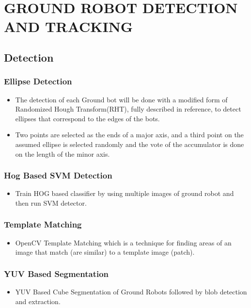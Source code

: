 \documentclass[12pt]{article}
\begin{document}
\section{GROUND ROBOT DETECTION AND TRACKING}
    \subsection{Detection}
        \subsubsection{Ellipse Detection}
            \begin{itemize}
                \item The detection of each Ground bot will be done with a modified form of Randomized Hough Transform(RHT), fully described in reference, to detect ellipses that correspond to the edges of the bots. 
                \item Two points are selected as the ends of a major axis, and a third point on the assumed ellipse is selected randomly and the vote of the accumulator is done on the length of the minor axis.
            
            \end{itemize}
        \subsubsection{Hog Based SVM Detection}
            \begin{itemize}
                \item Train HOG based classifier by using multiple images of ground robot and then run SVM detector.
            \end{itemize}
        \subsubsection{Template Matching}
            \begin{itemize}
                \item OpenCV Template Matching which is a technique for finding areas of an image that match (are similar) to a template image (patch).
            \end{itemize}
        \subsubsection{YUV Based Segmentation}
         \begin{itemize}
             \item YUV Based Cube Segmentation of Ground Robots followed by blob detection and extraction.
         \end{itemize}
         
\end{document}
